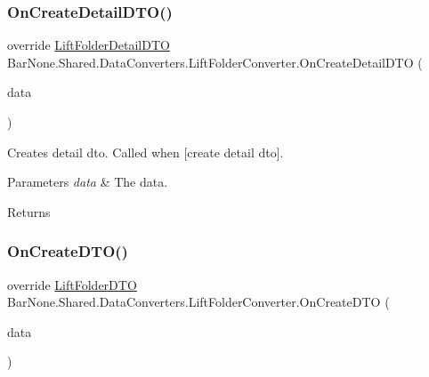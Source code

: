 \subsubsection{\texorpdfstring{On\+Create\+Detail\+D\+T\+O()}{OnCreateDetailDTO()}}
{\footnotesize\ttfamily override \mbox{\hyperlink{class_bar_none_1_1_shared_1_1_data_transfer_1_1_lift_folder_detail_d_t_o}{Lift\+Folder\+Detail\+D\+TO}} Bar\+None.\+Shared.\+Data\+Converters.\+Lift\+Folder\+Converter.\+On\+Create\+Detail\+D\+TO (\begin{DoxyParamCaption}\item[{\mbox{\hyperlink{class_bar_none_1_1_shared_1_1_domain_model_1_1_lift_folder}{Lift\+Folder}}}]{data }\end{DoxyParamCaption})}



Creates detail dto. Called when \mbox{[}create detail dto\mbox{]}. 


\begin{DoxyParams}{Parameters}
{\em data} & The data.\\
\hline
\end{DoxyParams}
\begin{DoxyReturn}{Returns}

\end{DoxyReturn}
\mbox{\label{class_bar_none_1_1_shared_1_1_data_converters_1_1_lift_folder_converter_a9e9000bc478d26151ca4941de25212a3}} 
\subsubsection{\texorpdfstring{On\+Create\+D\+T\+O()}{OnCreateDTO()}}
{\footnotesize\ttfamily override \mbox{\hyperlink{class_bar_none_1_1_shared_1_1_data_transfer_1_1_lift_folder_d_t_o}{Lift\+Folder\+D\+TO}} Bar\+None.\+Shared.\+Data\+Converters.\+Lift\+Folder\+Converter.\+On\+Create\+D\+TO (\begin{DoxyParamCaption}\item[{\mbox{\hyperlink{class_bar_none_1_1_shared_1_1_domain_model_1_1_lift_folder}{Lift\+Folder}}}]{data }\end{DoxyParamCaption})}



